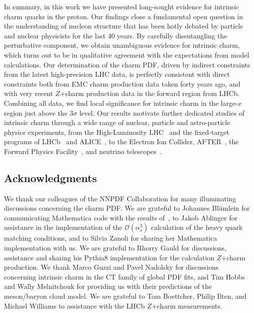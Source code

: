 \documentclass[11pt,a4paper]{article}
\newcommand{\lp}{\left(}
\newcommand{\rp}{\right)}
\begin{document}
In summary, in this work we have presented
long-sought evidence for intrinsic charm quarks in the proton.
%
Our findings
close a fundamental open question
in the understanding of nucleon structure that has been hotly
debated by  particle and nuclear physicists for the last 40 years.
%
By carefully disentangling the perturbative component,
we obtain unambiguous evidence for intrinsic charm, 
which turns out to be in qualitative agreement with
the expectations from model calculations.
%
Our determination of the charm PDF, driven by indirect constraints from the 
latest high-precision LHC data, is perfectly
consistent with direct constraints both from EMC charm production
data taken forty years  
ago, and with very recent  $Z$+charm production data in the
forward region from LHCb.
%
Combining all data, we find
local significance for intrinsic charm in the large-$x$
region just above the  $3\sigma$ level.
%
Our results motivate
further dedicated studies of intrinsic charm through a wide range
of nuclear, particle and astro-particle physics experiments,
from the High-Luminosity LHC~\cite{Azzi:2019yne}
and the fixed-target programs of LHCb~\cite{LHCb:2018jry} and
ALICE~\cite{QCDWorkingGroup:2019dyv}, to
the  
Electron Ion Collider, AFTER~\cite{Hadjidakis:2018ifr},
the Forward Physics Facility~\cite{Anchordoqui:2021ghd},
and neutrino telescopes~\cite{Halzen:2016thi}.


\subsection*{Acknowledgments}

We thank our colleagues of the NNPDF Collaboration
for many illuminating discussions concerning the charm PDF.
%
We are grateful to Johannes Bl\"umlein for communicating  {\sc\small Mathematica}
code with the results
of~\cite{Bierenbaum:2009zt,Bierenbaum:2009mv,Ablinger:2010ty,Ablinger:2014vwa,Ablinger:2014uka,Behring:2014eya,Ablinger_2014,Ablinger:2014nga,Blumlein:2017wxd}, to
Jakob Ablinger for assistance
in the implementation of the $\mathcal{O}\lp \alpha_s^3 \rp$ calculation
of the heavy quark matching conditions, and to Silvia Zanoli
for sharing her {\sc\small Mathematica} implementation with us.
%
%
We are grateful to Rhorry Gauld for discussions, assistance and sharing his {\sc\small Pythia8} 
implementation for the calculation $Z$+charm production.
%
We thank Marco Guzzi and Pavel Nadolsky for discussions concerning intrinsic charm
in the CT family of global PDF fits, and Tim Hobbs and Wally Melnitchouk for providing
us with their predictions of the meson/baryon cloud model.
%
We are grateful to Tom Boettcher, Philip Ilten, and Michael Williams to assistance
with the LHCb $Z$+charm measurements.
\end{document}
